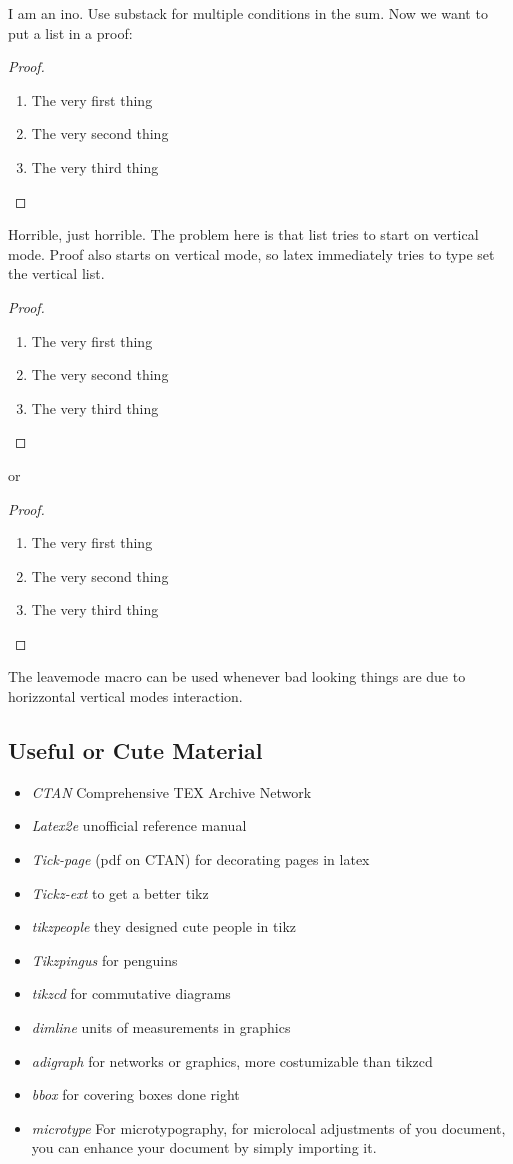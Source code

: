 \documentclass[11pt,a4paper,oneside,openany]{book}
\begin{document}
I am an ino. Use substack for multiple conditions in the sum.
Now we want to put a list in a proof:
\begin{proof}
    \begin{enumerate}
        \item The very first thing
        \item The very second thing
        \item The very third thing
    \end{enumerate}
\end{proof}
Horrible, just horrible. The problem here is that list tries to start on vertical mode. Proof also starts on vertical mode, so latex immediately tries to type set the vertical list. 
\begin{proof}\
    \begin{enumerate}
        \item The very first thing
        \item The very second thing
        \item The very third thing
    \end{enumerate}
\end{proof}
or
\begin{proof}\leavevmode
    \begin{enumerate}
        \item The very first thing
        \item The very second thing
        \item The very third thing
    \end{enumerate}
\end{proof}
The leavemode macro can be used whenever bad looking things are due to horizzontal vertical modes interaction.

\subsection{Useful or Cute Material}
\begin{itemize}
    \item \emph{CTAN} Comprehensive TEX Archive Network
    \item \emph{Latex2e} unofficial reference manual
    \item \emph{Tick-page} (pdf on CTAN) for decorating pages in latex
    \item \emph{Tickz-ext} to get a better tikz
    \item \emph{tikzpeople} they designed cute people in tikz
    \item \emph{Tikzpingus} for penguins
    \item \emph{tikzcd} for commutative diagrams
    \item \emph{dimline} units of measurements in graphics
    \item \emph{adigraph} for networks or graphics, more costumizable than tikzcd
    \item \emph{bbox} for covering boxes done right
    \item \emph{microtype} For microtypography, for microlocal adjustments of you document, you can enhance your document by simply importing it.
    
\end{itemize}
\end{document}
